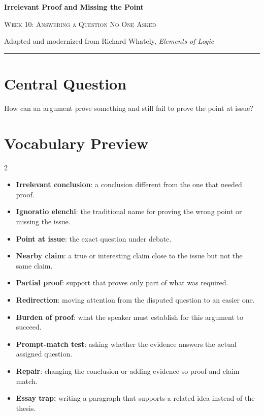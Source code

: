 \documentclass[12pt]{article}
\begin{document}
\begin{center}
{\LARGE\bfseries Irrelevant Proof and Missing the Point}\par\vspace{0.25em}
{\large\scshape Week 10: Answering a Question No One Asked}\par\vspace{0.5em}
{Adapted and modernized from Richard Whately, \textit{Elements of Logic}}\par\vspace{0.6em}
\rule{0.82\textwidth}{0.4pt}
\end{center}

\section*{Central Question}
How can an argument prove something and still fail to prove the point at issue?

\section*{Vocabulary Preview}
\begin{multicols}{2}
\begin{itemize}[leftmargin=*, itemsep=0.18em]
\item \textbf{Irrelevant conclusion}: a conclusion different from the one that needed proof.
\item \textbf{Ignoratio elenchi}: the traditional name for proving the wrong point or missing the issue.
\item \textbf{Point at issue}: the exact question under debate.
\item \textbf{Nearby claim}: a true or interesting claim close to the issue but not the same claim.
\item \textbf{Partial proof}: support that proves only part of what was required.
\item \textbf{Redirection}: moving attention from the disputed question to an easier one.
\item \textbf{Burden of proof}: what the speaker must establish for this argument to succeed.
\item \textbf{Prompt-match test}: asking whether the evidence answers the actual assigned question.
\item \textbf{Repair}: changing the conclusion or adding evidence so proof and claim match.
\item \textbf{Essay trap:} writing a paragraph that supports a related idea instead of the thesis.
\end{itemize}
\end{multicols}
\end{document}
